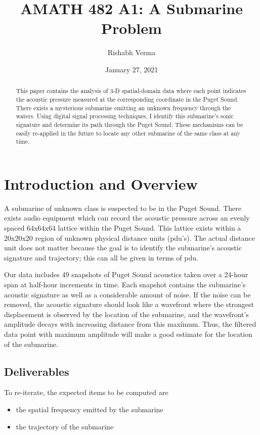 \documentclass{article}
\title{AMATH 482 A1: A Submarine Problem}
\author{Rishabh Verma}
\date{January 27, 2021}
\begin{document}
\maketitle

\begin{abstract}
    This paper contains the analysis of 3-D spatial-domain data where each point indicates the acoustic pressure measured at the corresponding coordinate in the Puget Sound. There exists a mysterious submarine emitting an unknown frequency through the waters. Using digital signal processing techniques, I identify this submarine's sonic signature and determine its path through the Puget Sound. These mechanisms can be easily re-applied in the future to locate any other submarine of the same class at any time.
\end{abstract}

\section{Introduction and Overview}
A submarine of unknown class is suspected to be in the Puget Sound. There exists audio equipment which can record the acoustic pressure across an evenly spaced 64x64x64 lattice within the Puget Sound. This lattice exists within a 20x20x20 region of unknown physical distance units (pdu's). The actual distance unit does not matter because the goal is to identify the submarine's acoustic signature and trajectory; this can all be given in terms of pdu.

Our data includes 49 snapshots of Puget Sound acoustics taken over a 24-hour span at half-hour increments in time. Each snapshot contains the submarine's acoustic signature as well as a considerable amount of noise. If the noise can be removed, the acoustic signature should look like a wavefront where the strongest displacement is observed by the location of the submarine, and the wavefront's amplitude decays with increasing distance from this maximum. Thus, the filtered data point with maximum amplitude will make a good estimate for the location of the submarine.

\subsection{Deliverables}

To re-iterate, the expected items to be computed are

\begin{itemize}
	\item the spatial frequency emitted by the submarine
	\item the trajectory of the submarine
	\end{itemize}
\end{document}

